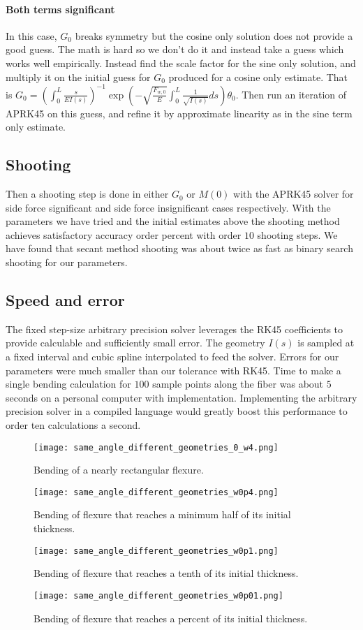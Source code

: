 \documentclass[12pt,reqno]{article}
\begin{document}
	\paragraph{Both terms significant}
	In this case, $G_{0}$ breaks symmetry but the cosine only solution does not provide a good guess. The math is hard so we don't do it and instead take a guess which works well empirically. Instead find the scale factor for the sine only solution, and multiply it on the initial guess for $G_{0}$ produced for a cosine only estimate. That is 
	$
		G_{0} =(\int_{0}^{L}\frac{s}{EI(s)})^{-1} \exp(-{\sqrt{\frac{F_{w,0}}{E}}}\int_{0}^{L}\frac{1}{\sqrt{I(s)}}ds) \theta_{0} 
	$. Then run an iteration of APRK45 on this guess, and refine it by approximate linearity as in the sine term only estimate.

	\subsection{Shooting}
	Then a shooting step is done in either $G_{0}$ or $M(0)$ with the APRK45 solver for side force significant and side force insignificant cases respectively. With the parameters we have tried and the initial estimates above the shooting method achieves satisfactory accuracy order percent with order $10$ shooting steps. We have found that secant method shooting was about twice as fast as binary search shooting for our parameters. 
	
	\subsection{Speed and error}
	The fixed step-size arbitrary precision solver leverages the RK45 coefficients to provide calculable and sufficiently small error. The geometry $I(s)$ is sampled at a fixed interval and cubic spline interpolated to feed the solver. Errors for our parameters were much smaller than our tolerance with RK45. Time to make a single bending calculation for $100$ sample points along the fiber was about $5$ seconds on a personal computer with  implementation. Implementing the arbitrary precision solver in a compiled language would greatly boost this performance to order ten calculations a second.
	
	\begin{figure}[H]
		\texttt{[image: same\_angle\_different\_geometries\_0\_w4.png]}
		\caption{Bending of a nearly rectangular flexure.}
	\end{figure}
	\begin{figure}[H]
		\texttt{[image: same\_angle\_different\_geometries\_w0p4.png]}
		\caption{Bending of flexure that reaches a minimum half of its initial thickness.}
	\end{figure}
	\begin{figure}[H]
		\texttt{[image: same\_angle\_different\_geometries\_w0p1.png]}
		\caption{Bending of flexure that reaches a tenth of its initial thickness.}
	\end{figure}
		\begin{figure}[H]
		\texttt{[image: same\_angle\_different\_geometries\_w0p01.png]}
		\caption{Bending of flexure that reaches a percent of its initial thickness.}
	\end{figure}
	
\end{document}
